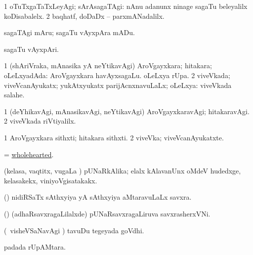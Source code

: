 \bentry
{} 
\gl{\kirxvi}
\bmng
\bnum
\num{1} oTuTxgaTaTxLeyAgi; sArAsagaTAgi:  nAnu adanunx ninage sagaTu beleyalilx koDisabalelx. 
\num{2} baqhatf, doDaDx -- parxmANadalilx. 
\enum
\emng
\eentry

\bentry
{} 
\gl{\sakirx}
\bmng
sagaTAgi mAru; sagaTu vAyxpAra mADu. 
\emng
\eentry

\bentry
{}
\gl{\nA}
\bmng
sagaTu vAyxpAri. 
\emng
\eentry

\bentry
{} 
\gl{\gu}
\expl{}
\bmng
\bnum
\num{1} (shAriVraka, mAnasika yA neYtikavAgi) AroVgayxkara; hitakara; oLeLxyadAda:  AroVgayxkara havAyxsagaLu.  oLeLxya rUpa. 
\num{2} viveVkada; viveVcanAyukatx; yukAtxyukatx parijAcnxnavuLaLx; oLeLxya:  viveVkada salahe. 
\enum
\emng
\eentry

\bentry
{} 
\gl{\kirxvi}
\expl{}
\bmng
\bnum
\num{1} (deYhikavAgi, mAnasikavAgi, neYtikavAgi) AroVgayxkaravAgi; hitakaravAgi. 
\num{2} viveVkada riVtiyalilx. 
\enum
\emng
\eentry

\bentry
{}
\gl{\nA}
\bmng
\bnum
\num{1} AroVgayxkara sithxti; hitakara sithxti. 
\num{2} viveVka; viveVcanAyukatxte. 
\enum
\emng
\eentry

\bentry
{}
\gl{\gu}
\bmng
= \hyperlink{wholehearted}{wholehearted}. 
\emng
\eentry

\bentry
{}
\gl{\gu}
\bmng
(kelasa, vaqtitx, \mo vugaLa \vi) pUNaRkAlika; elalx kAlavanUnx oMdeV hudedxge, kelasakekx, viniyoVgisatakakx. 
\emng
\eentry

\bentry
{}
\gl{\nA}
\bmng
(\saM) nidiRSaTx sAthxyiya yA sAthxyiya aMtaravuLaLx savxra. 
\emng
\eentry

\bentry
{}
\gl{\nA}
\bmng
(\saM) (adhaRsavxragaLilalxde) pUNaRsavxragaLiruva savxrasherxVNi. 
\emng
\eentry

\bentry
{}
\gl{\nA}
\bmng
(\sA\ visheVSaNavAgi \parx) tavuDu tegeyada goVdhi. 
\emng
\eentry

\bentry
{}
\gl{\nA}
\bmng
{} padada rUpAMtara. 
\emng
\eentry

